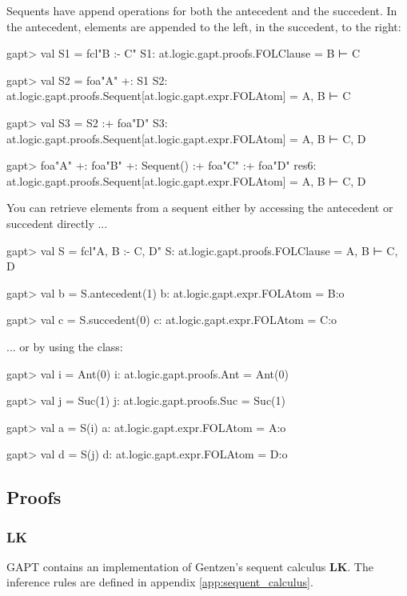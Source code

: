 \documentclass[a4paper,11pt]{article}
\newcommand{\LK}{\textbf{LK}}
\newcommand{\cli}[1]{{\ttfamily {#1}}}
\begin{document}
Sequents have append operations for both the antecedent and the succedent. In the antecedent,
elements are appended to the left, in the succedent, to the right:

\begin{clilisting}
gapt> val S1 = fcl"B :- C"
S1: at.logic.gapt.proofs.FOLClause = B ⊢ C

gapt> val S2 = foa"A" +: S1
S2: at.logic.gapt.proofs.Sequent[at.logic.gapt.expr.FOLAtom] = A, B ⊢ C

gapt> val S3 = S2 :+ foa"D"
S3: at.logic.gapt.proofs.Sequent[at.logic.gapt.expr.FOLAtom] = A, B ⊢ C, D

gapt> foa"A" +: foa"B" +: Sequent() :+ foa"C" :+ foa"D"
res6: at.logic.gapt.proofs.Sequent[at.logic.gapt.expr.FOLAtom] = A, B ⊢ C, D

\end{clilisting}

You can retrieve elements from a sequent either by accessing the antecedent
or succedent directly ...
\begin{clilisting}
gapt> val S = fcl"A, B :- C, D"
S: at.logic.gapt.proofs.FOLClause = A, B ⊢ C, D

gapt> val b = S.antecedent(1)
b: at.logic.gapt.expr.FOLAtom = B:o

gapt> val c = S.succedent(0)
c: at.logic.gapt.expr.FOLAtom = C:o

\end{clilisting}
... or by using the \cli{SequentIndex} class:

\begin{clilisting}
gapt> val i = Ant(0)
i: at.logic.gapt.proofs.Ant = Ant(0)

gapt> val j = Suc(1)
j: at.logic.gapt.proofs.Suc = Suc(1)

gapt> val a = S(i)
a: at.logic.gapt.expr.FOLAtom = A:o

gapt> val d = S(j)
d: at.logic.gapt.expr.FOLAtom = D:o

\end{clilisting}


\subsection{Proofs}\label{sec:entering_proofs}

\subsubsection{LK}
GAPT contains an implementation of Gentzen's sequent calculus \LK .
The inference rules are defined in appendix \ref{app:sequent_calculus}.
\end{document}
